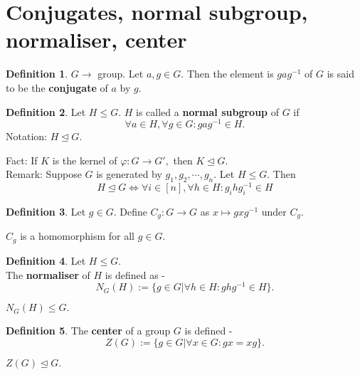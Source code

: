 \documentclass[12 pt, a4paper, toc=graduated, oneside]{article}
\theoremstyle{definition}
\newtheorem{defn}{Definition}
\begin{document}
\section{Conjugates, normal subgroup, normaliser, center}
\begin{defn}
	$G \to$ group. Let $a, g \in G.$ Then the element is $gag^{-1}$ of $G$ is said to be the \textbf{conjugate} of $a$ by $g.$ 
\end{defn}
\begin{defn}
	Let $H \le G.$ $H$ is called a \textbf{normal subgroup} of $G$ if
	\[\forall a \in H, \forall g \in G: gag^{-1} \in H.\]
	Notation: $H \trianglelefteq G.$
\end{defn}
Fact: If $K$ is the kernel of $\varphi:G\to G',$ then $K \trianglelefteq G.$\\
Remark: Suppose $G$ is generated by $g_1, g_2, \cdots, g_n.$ Let $H \le G.$ Then
\[H \trianglelefteq G \iff \forall i \in [n], \forall h \in H: g_ihg_i^{-1} \in H\]
\begin{defn}
	Let $g\in G.$ Define $C_g:G\to G$ as $x \mapsto gxg^{-1}$ under $C_g.$
\end{defn}
$C_g$ is a homomorphism for all $g \in G.$
\begin{defn}
	Let $H \le G.$\\
	The \textbf{normaliser} of $H$ is defined as -
	\[N_G(H) := \{g \in G | \forall h \in H : ghg^{-1}\in H\}.\]
\end{defn}
$N_G(H) \le G.$
\begin{defn}
	The \textbf{center} of a group $G$ is defined -
	\[Z(G) := \{g \in G | \forall x \in G: gx = xg\}.\]
\end{defn}
$Z(G) \trianglelefteq G.$
\end{document}
